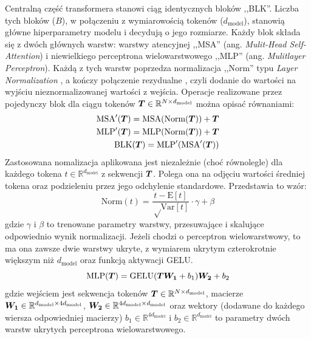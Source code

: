 Centralną część transformera stanowi ciąg identycznych bloków ,,BLK''. Liczba tych bloków ($B$), w
połączeniu z wymiarowością tokenów ($d_{\mathrm{model}}$), stanowią główne hiperparametry modelu i
decydują o jego rozmiarze. Każdy blok składa się z dwóch głównych warstw: warstwy atencyjnej ,,MSA''
(ang. \emph{Mulit-Head Self-Attention}) i niewielkiego perceptrona wielowarstwowego ,,MLP'' (ang.
\emph{Mulitlayer Perceptron}). Każdą z tych warstw poprzedza normalizacja ,,Norm'' typu \emph{Layer
Normalization} \cite{ba_layer_2016}, a kończy połączenie rezydualne \cite{he_deep_2015}, czyli
dodanie do wartości na wyjściu nieznormalizowanej wartości z wejścia. Operacje realizowane przez
pojedynczy blok dla ciągu tokenów $\boldsymbol{T} \in \mathbb{R}^{N \times d_{\mathrm{model}}}$ można opisać równaniami:
\begin{eqnarray}
     \textrm{MSA}'(\boldsymbol{T}) = \textrm{MSA}(\textrm{Norm}(\boldsymbol{T})) + \boldsymbol{T} \\
     \textrm{MLP}'(\boldsymbol{T}) = \textrm{MLP}(\textrm{Norm}(\boldsymbol{T})) + \boldsymbol{T} \\
     \textrm{BLK}(\boldsymbol{T}) = \textrm{MLP}'(\textrm{MSA}'(\boldsymbol{T}))
\end{eqnarray}
Zastosowana nomalizacja aplikowana jest niezależnie (choć równolegle) dla każdego tokena $t \in
\mathbb{R}^{d_{\mathrm{model}}}$ z sekwencji $\boldsymbol{T}$. Polega ona na odjęciu wartości średniej
tokena oraz podzieleniu przez jego odchylenie standardowe. Przedstawia to wzór:
\begin{equation}
    \textrm{Norm}(t) = \frac{t - \textrm{E}[t]}{\sqrt \textrm{Var}[t]} \cdot \gamma + \beta
\end{equation}
gdzie $\gamma$ i $\beta$ to trenowane parametry warstwy, przesuwające i skalujące odpowiednio wynik
normalizacji. Jeżeli chodzi o perceptron wielowarstwowy, to ma ona zawsze dwie warstwy ukryte, z
wymiarem ukrytym czterokrotnie większym niż $d_{\mathrm{model}}$ oraz funkcją aktywacji GELU.
\begin{equation}
    \textrm{MLP}(\boldsymbol{T}) = \textrm{GELU}(\boldsymbol{T}\boldsymbol{W_1} + b_1)\boldsymbol{W_2} + b_2
\end{equation}
gdzie wejściem jest sekwencja tokenów $\boldsymbol{T} \in \mathbb{R}^{N \times d_{\mathrm{model}}}$, macierze
$\boldsymbol{W_1} \in \mathbb{R}^{d_{\mathrm{model}} \times 4d_{\mathrm{model}}}$,
$\boldsymbol{W_2} \in \mathbb{R}^{4d_{\mathrm{model}} \times d_{\mathrm{model}}}$ oraz wektory (dodawane do każdego wiersza
odpowiedniej macierzy) $b_1 \in \mathbb{R}^{4d_{\mathrm{model}}}$ i $b_2 \in
\mathbb{R}^{d_{\mathrm{model}}}$ to parametry dwóch warstw ukrytych perceptrona wielowarstwowego.

